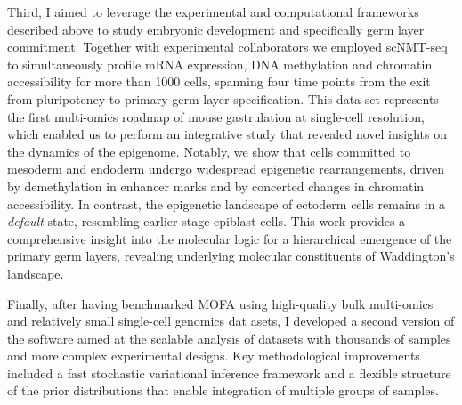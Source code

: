 Third, I aimed to leverage the experimental and computational frameworks described above to study embryonic development and specifically germ layer commitment. Together with experimental collaborators we employed scNMT-seq to simultaneously profile mRNA expression, DNA methylation and chromatin accessibility for more than 1000 cells, spanning four time points from the exit from pluripotency to primary germ layer specification. This data set represents the first multi-omics roadmap of mouse gastrulation at single-cell resolution, which enabled us to perform an integrative study that revealed novel insights on the dynamics of the epigenome. Notably, we show that cells committed to mesoderm and endoderm undergo widespread epigenetic rearrangements, driven by demethylation in enhancer marks and by concerted changes in chromatin accessibility. In contrast, the epigenetic landscape of ectoderm cells remains in a \textit{default} state, resembling earlier stage epiblast cells. This work provides a comprehensive insight into the molecular logic for a hierarchical emergence of the primary germ layers, revealing underlying molecular constituents of Waddington's landscape.

Finally, after having benchmarked MOFA using high-quality bulk multi-omics and relatively small single-cell genomics dat asets, I developed a second version of the software aimed at the scalable analysis of datasets with thousands of samples and more complex experimental designs. Key methodological improvements included a fast stochastic variational inference framework and a flexible structure of the prior distributions that enable integration of multiple groups of samples. 
